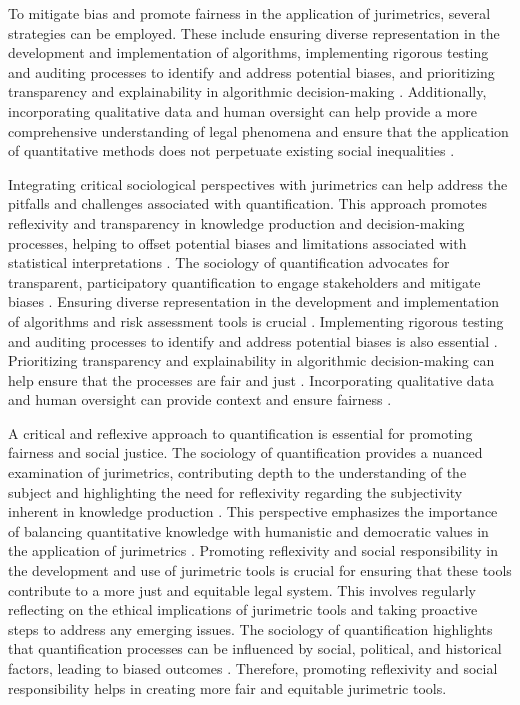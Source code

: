 To mitigate bias and promote fairness in the application of jurimetrics, several strategies can be employed. These include ensuring diverse representation in the development and implementation of algorithms, implementing rigorous testing and auditing processes to identify and address potential biases, and prioritizing transparency and explainability in algorithmic decision-making \cite{10.1007/s11186-021-09453-1,10.3390/fi9040068}. Additionally, incorporating qualitative data and human oversight can help provide a more comprehensive understanding of legal phenomena and ensure that the application of quantitative methods does not perpetuate existing social inequalities \cite{10.1007/s11186-021-09453-1,10.3390/fi9040068}.

Integrating critical sociological perspectives with jurimetrics can help address the pitfalls and challenges associated with quantification. This approach promotes reflexivity and transparency in knowledge production and decision-making processes, helping to offset potential biases and limitations associated with statistical interpretations \cite{internalknowledgesources}. The sociology of quantification advocates for transparent, participatory quantification to engage stakeholders and mitigate biases \cite{internalknowledgesources}. Ensuring diverse representation in the development and implementation of algorithms and risk assessment tools is crucial \cite{10.1590/data.2022.65.3.267,10.32586/rcda.v18i1.585}. Implementing rigorous testing and auditing processes to identify and address potential biases is also essential \cite{10.1590/data.2022.65.3.267,10.32586/rcda.v18i1.585}. Prioritizing transparency and explainability in algorithmic decision-making can help ensure that the processes are fair and just \cite{10.1590/data.2022.65.3.267,10.32586/rcda.v18i1.585}. Incorporating qualitative data and human oversight can provide context and ensure fairness \cite{10.1590/data.2022.65.3.267,10.32586/rcda.v18i1.585}.

A critical and reflexive approach to quantification is essential for promoting fairness and social justice. The sociology of quantification provides a nuanced examination of jurimetrics, contributing depth to the understanding of the subject and highlighting the need for reflexivity regarding the subjectivity inherent in knowledge production \cite{10.1590/data.2022.65.3.267,10.1057/s41599-020-0396-5}. This perspective emphasizes the importance of balancing quantitative knowledge with humanistic and democratic values in the application of jurimetrics \cite{10.1590/data.2022.65.3.267,10.1057/s41599-020-00557-0}. Promoting reflexivity and social responsibility in the development and use of jurimetric tools is crucial for ensuring that these tools contribute to a more just and equitable legal system. This involves regularly reflecting on the ethical implications of jurimetric tools and taking proactive steps to address any emerging issues. The sociology of quantification highlights that quantification processes can be influenced by social, political, and historical factors, leading to biased outcomes \cite{10.1007/s11186-021-09453-1,loevinger1959}. Therefore, promoting reflexivity and social responsibility helps in creating more fair and equitable jurimetric tools.

